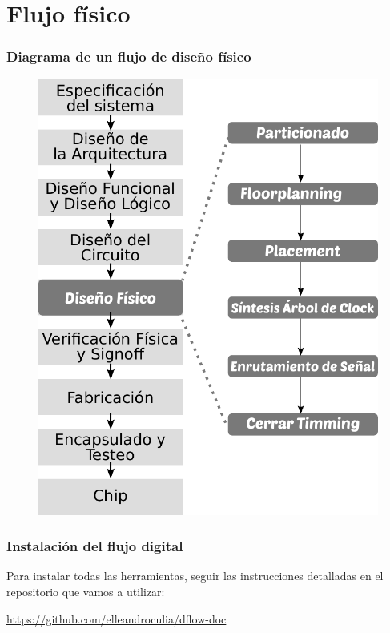 \documentclass{beamer}
\begin{document}
\section{Flujo físico}
\begin{frame}
  \frametitle{Diagrama de un flujo de diseño físico}

 \begin{figure}[h]
 \centering
 \includegraphics[scale=0.40]{figuras/DisenioFisico.pdf}
 \end{figure}

\end{frame}
\begin{frame}
  \frametitle{Instalación del flujo digital}
  Para instalar todas las herramientas, seguir las instrucciones detalladas en el repositorio que vamos a utilizar:

  \url{https://github.com/elleandroculia/dflow-doc}

\end{frame}
\end{document}
